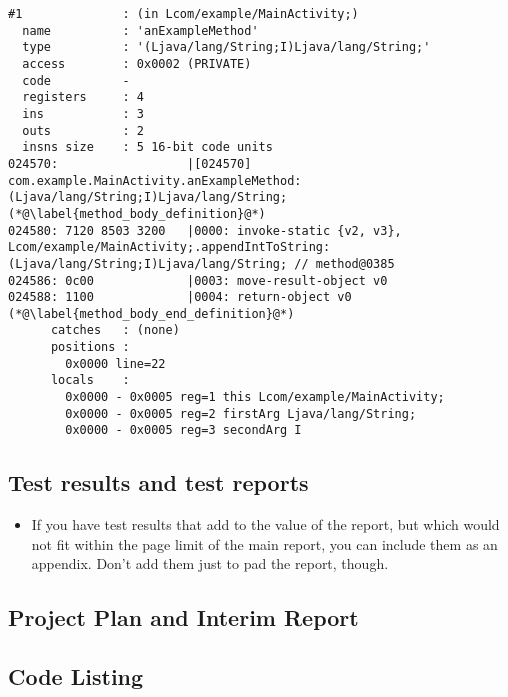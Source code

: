 \begin{lstlisting}
#1              : (in Lcom/example/MainActivity;)
  name          : 'anExampleMethod'
  type          : '(Ljava/lang/String;I)Ljava/lang/String;'
  access        : 0x0002 (PRIVATE)
  code          -
  registers     : 4
  ins           : 3
  outs          : 2
  insns size    : 5 16-bit code units
024570:                  |[024570] com.example.MainActivity.anExampleMethod:(Ljava/lang/String;I)Ljava/lang/String; (*@\label{method_body_definition}@*)
024580: 7120 8503 3200   |0000: invoke-static {v2, v3}, Lcom/example/MainActivity;.appendIntToString:(Ljava/lang/String;I)Ljava/lang/String; // method@0385
024586: 0c00             |0003: move-result-object v0
024588: 1100             |0004: return-object v0 (*@\label{method_body_end_definition}@*)
      catches   : (none)
      positions :
        0x0000 line=22
      locals    :
        0x0000 - 0x0005 reg=1 this Lcom/example/MainActivity;
        0x0000 - 0x0005 reg=2 firstArg Ljava/lang/String;
        0x0000 - 0x0005 reg=3 secondArg I
\end{lstlisting}


\subsection{Test results and test reports}

\begin{mdframed}
	\begin{itemize}
		\item If you have test results that add to the value of the report, but which would not fit within the page limit of the main report, you can include them as an appendix. Don't add them just to pad the report, though.
	\end{itemize}
\end{mdframed}

\subsection{Project Plan and Interim Report}





\subsection{Code Listing}

